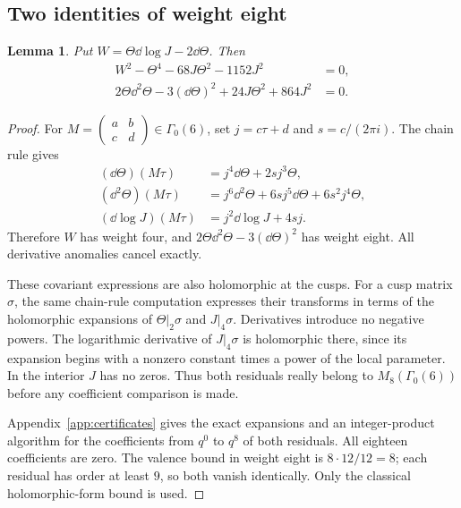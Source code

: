 \documentclass[11pt,a4paper]{article}
\newtheorem{lemma}[theorem]{Lemma}
\theoremstyle{remark}
\newcommand{\smat}[4]{\begin{pmatrix}#1&#2\\#3&#4\end{pmatrix}}
\begin{document}
\subsection{Two identities of weight eight}
\begin{lemma}\label{lem:weight8}
Put $W=\Theta\dd\log J-2\dd\Theta$. Then
\begin{align}
 W^2-\Theta^4-68J\Theta^2-1152J^2&=0,\label{eq:P1}\\
 2\Theta\dd^2\Theta-3(\dd\Theta)^2+24J\Theta^2+864J^2&=0.
 \label{eq:P2}
\end{align}
\end{lemma}
\begin{proof}
For $M=\smat abcd\in\Gamma_0(6)$, set
$j=c\tau+d$ and $s=c/(2\pi i)$. The chain rule gives
\begin{align*}
 (\dd\Theta)(M\tau)&=j^4\dd\Theta+2sj^3\Theta,\\
 (\dd^2\Theta)(M\tau)&=j^6\dd^2\Theta
                   +6sj^5\dd\Theta+6s^2j^4\Theta,\\
 (\dd\log J)(M\tau)&=j^2\dd\log J+4sj.
\end{align*}
Therefore $W$ has weight four, and
$2\Theta\dd^2\Theta-3(\dd\Theta)^2$ has weight eight.
All derivative anomalies cancel exactly.

These covariant expressions are also holomorphic at the cusps.
For a cusp matrix $\sigma$, the same chain-rule computation
expresses their transforms in terms of the holomorphic expansions
of $\Theta|_2\sigma$ and $J|_4\sigma$. Derivatives introduce no
negative powers. The logarithmic derivative of $J|_4\sigma$ is
holomorphic there, since its expansion begins with a nonzero
constant times a power of the local parameter.
In the interior $J$ has no zeros. Thus both residuals really belong
to $M_8(\Gamma_0(6))$ before any coefficient comparison is made.

Appendix~\ref{app:certificates} gives the exact expansions and
an integer-product algorithm for the coefficients from $q^0$ to
$q^8$ of both residuals. All eighteen coefficients are zero.
The valence bound in weight eight is $8\cdot12/12=8$;
each residual has order at least $9$, so both vanish identically.
Only the classical holomorphic-form bound is used.
\end{proof}
\end{document}

